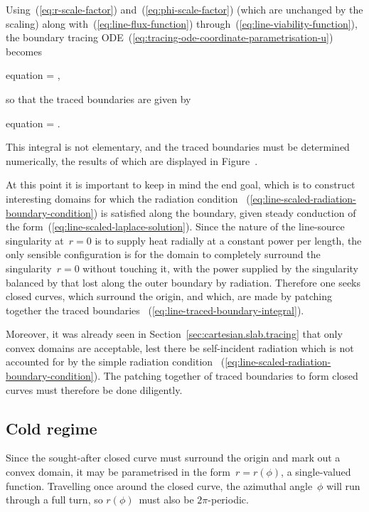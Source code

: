 Using~(\ref{eq:r-scale-factor}) and~(\ref{eq:phi-scale-factor})
(which are unchanged by the scaling)
along with~(\ref{eq:line-flux-function})
through~(\ref{eq:line-viability-function}),
the boundary tracing ODE~(\ref{eq:tracing-ode-coordinate-parametrisation-u})
becomes
\begin{important}{equation}
   = \mp {},
  \label{eq:line-tracing-ode-coordinate-parametrisation-r}
\end{important}
so that the traced boundaries are given by
\begin{important}{equation}
  \phi = \mp \int {}.
  \label{eq:line-traced-boundary-integral}
\end{important}
This integral is not elementary,
and the traced boundaries must be determined numerically,
the results of which are displayed in Figure~\tbd.

At this point it is important to keep in mind the end goal,
which is to construct interesting domains
for which the radiation condition~%
  (\ref{eq:line-scaled-radiation-boundary-condition})
is satisfied along the boundary,
given steady conduction of the form~(\ref{eq:line-scaled-laplace-solution}).
Since the nature of the line-source singularity at~$r = 0$
is to supply heat radially at a constant power per length,
the only sensible configuration is for the domain to
completely surround the singularity~$r = 0$ without touching it,
with the power supplied by the singularity balanced
by that lost along the outer boundary by radiation.
Therefore one seeks closed curves,
which surround the origin,
and which, are made by patching together the traced boundaries~%
  (\ref{eq:line-traced-boundary-integral}).

Moreover, it was already seen in Section~\ref{sec:cartesian.slab.tracing}
that only convex domains are acceptable,
lest there be self-incident radiation which is not accounted for
by the simple radiation condition~%
  (\ref{eq:line-scaled-radiation-boundary-condition}).
The patching together of traced boundaries to form closed curves
must therefore be done diligently.

\subsection{Cold regime}
\label{sec:polar.tracing.cold}

Since the sought-after closed curve must surround the origin
and mark out a convex domain,
it may be parametrised in the form~$r = r (\phi)$,
a single-valued function.
Travelling once around the closed curve,
the azimuthal angle~$\phi$ will run through a full turn,
so $r (\phi)$~must also be $2 \pi$-periodic.

